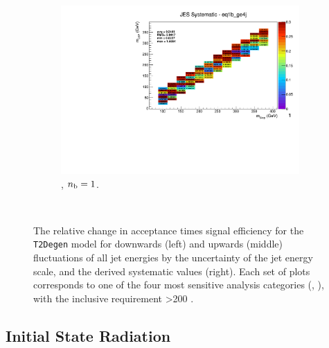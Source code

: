 \begin{figure}[ht!]
\begin{subfigure}[b]{0.32\textwidth}
    \includegraphics[width=\textwidth, page=1]{Figs/sms/t2degen/v19_2/systs/T2_4body_JES_eq1b_ge4j.pdf}
    \caption{\njhigh, $n_{\text{b}} = 1$.}
    \label{fig:sms-jes-tdegen-ge4j-1b}
  \end{subfigure}\\
  \caption{The relative change in acceptance times signal efficiency for the
  \texttt{T2Degen} model for downwards (left) and upwards (middle) fluctuations
  of all jet energies by the uncertainty of the jet energy scale, and the 
  derived systematic values (right). Each set of plots corresponds to one of
  the four most sensitive analysis categories (\nb, \nj), with the inclusive 
  requirement \HT>200 \gev.}
  \label{fig:sms-jes-t2degen}
\end{figure}


\newpage
\subsection*{Initial State Radiation}
\label{sec:t2degen_isr_plots}

